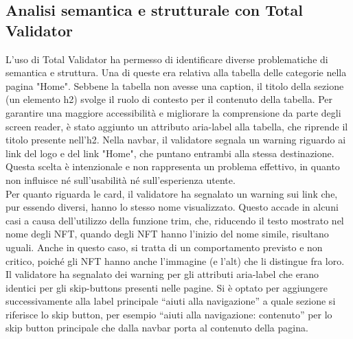 \documentclass[10pt]{article}
\begin{document}
\subsection{Analisi semantica e strutturale con Total Validator}
L’uso di Total Validator ha permesso di identificare diverse problematiche di semantica e struttura. Una di queste era relativa alla tabella delle categorie nella pagina "Home". Sebbene la tabella non avesse una caption, il titolo della sezione (un elemento h2) svolge il ruolo di contesto per il contenuto della tabella. Per garantire una maggiore accessibilità e migliorare la comprensione da parte degli screen reader, è stato aggiunto un attributo aria-label alla tabella, che riprende il titolo presente nell'h2.
Nella navbar, il validatore segnala un warning riguardo ai link del logo e del link "Home", che puntano entrambi alla stessa destinazione. Questa scelta è intenzionale e non rappresenta un problema effettivo, in quanto non influisce né sull’usabilità né sull’esperienza utente.\\
Per quanto riguarda le card, il validatore ha segnalato un warning sui link che, pur essendo diversi, hanno lo stesso nome visualizzato. Questo accade in alcuni casi a causa dell’utilizzo della funzione trim, che, riducendo il testo mostrato nel nome degli NFT, quando degli NFT hanno l'inizio del nome simile, risultano uguali. Anche in questo caso, si tratta di un comportamento previsto e non critico, poiché gli NFT hanno anche l'immagine (e l'alt) che li distingue fra loro.\\
Il validatore ha segnalato dei warning per gli attributi aria-label che erano identici per gli skip-buttons presenti nelle pagine. Si è optato per aggiungere successivamente alla label principale ``aiuti alla navigazione'' a quale sezione si riferisce lo skip button, per esempio ``aiuti alla navigazione: contenuto'' per lo skip button principale che dalla navbar porta al contenuto della pagina.
\end{document}
